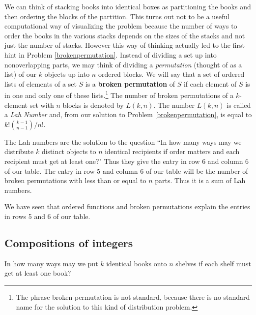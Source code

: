 We can think of stacking books into identical boxes as partitioning the
books and then ordering the blocks of the partition.  This turns out not
to be a useful computational way of visualizing the problem because the
number of ways to order the books in the various stacks depends on the
sizes of the stacks and not just the number of stacks.  However this way
of thinking actually led to the first hint in Problem
\ref{brokenpermutation}.  Instead of dividing a set up into
nonoverlapping parts, we may think of dividing a {\em permutation}
(thought of as a list) of our $k$ objects up into $n$ ordered blocks.  We
will say that a set of ordered lists of elements of a set $S$ is a {\bf
broken permutation}
of $S$ if each element of $S$ is in one and only one of these
lists.\footnote{The phrase broken permutation is not standard,
because there is no standard name for the solution to this kind  of
distribution problem.}   The number of broken permutations of a
$k$-element set with
$n$ blocks is denoted by $L(k,n)$.  The number $L(k,n)$ is called a
{\em Lah Number} and, from our solution to Problem
\ref{brokenpermutation}, is equal to $k!{k-1\choose n-1}/n!$.

The Lah numbers are the solution to the question ``In how many ways may we
distribute $k$ distinct objects to $n$ identical recipients if order
matters and each recipient must get at least one?"  Thus they give the
entry in row 6 and column 6 of our table.  The entry in row 5 and column
6 of our table will be the number of broken permutations with less than
or equal to $n$ parts.  Thus it is a sum of Lah numbers.

We have seen that ordered functions and broken permutations explain the
entries in rows 5 and 6 of our table.
\subsection{Compositions of integers}
\bp 
\itemes In how many ways may we put $k$ identical books onto $n$ shelves
if each shelf must get at least one book?

